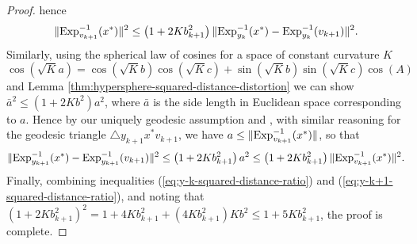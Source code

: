 \begin{proof}
	hence
	\begin{equation} \label{eq:y-k-squared-distance-ratio}
	\|\mathrm{Exp}_{v_{k+1}}^{-1}(x^*)\|^2 \le \left(1+2K b_{k+1}^2\right)\|\mathrm{Exp}_{y_k}^{-1}(x^*)-\mathrm{Exp}_{y_k}^{-1}(v_{k+1})\|^2.
	\end{equation}
	Similarly, using the spherical law of cosines for a space of constant curvature $K$ 
	\[ \cos(\sqrt{K}a) = \cos(\sqrt{K}b)\cos(\sqrt{K}c) + \sin(\sqrt{K}b)\sin(\sqrt{K}c)\cos(A) \]
	and Lemma \ref{thm:hypersphere-squared-distance-distortion} we can show $\bar{a}^2 \le (1+2K b^2)a^2$, where $\bar{a}$ is the  side length in Euclidean space corresponding to $a$. 
	Hence by our uniquely geodesic assumption and \citep[Theorem 2.2, Remark 7]{meyer1989toponogov}, with similar reasoning for the geodesic triangle $\triangle y_{k+1} x^* v_{k+1}$, we have $a \le \|\mathrm{Exp}_{v_{k+1}}^{-1}(x^*)\|$, so that
	\begin{equation} \label{eq:y-k+1-squared-distance-ratio}
	\|\mathrm{Exp}_{y_{k+1}}^{-1}(x^*)-\mathrm{Exp}_{y_{k+1}}^{-1}(v_{k+1})\|^2 \le \left(1+2K b_{k+1}^2\right)a^2 \le \left(1+2K b_{k+1}^2\right)\|\mathrm{Exp}_{v_{k+1}}^{-1}(x^*)\|^2.
	\end{equation}
	Finally, combining inequalities (\ref{eq:y-k-squared-distance-ratio}) and (\ref{eq:y-k+1-squared-distance-ratio}), and noting that $(1+2K b_{k+1}^2)^2 = 1+4K b_{k+1}^2 + (4K b_{k+1}^2)K b^2 \le 1 + 5K b_{k+1}^2$, the proof is complete.
\end{proof}
